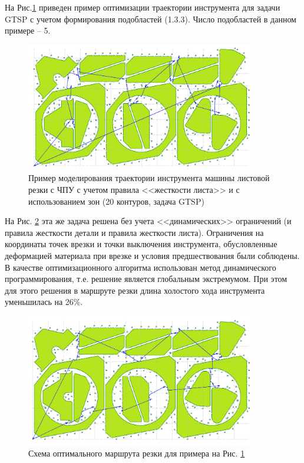 \documentclass[11pt,twoside,openany]{report}
\begin{document}
На Рис.\ref{zones-a}
приведен пример оптимизации траектории
инструмента для задачи GTSP с учетом
формирования подобластей  (1.3.3).
Число подобластей в данном примере – 5.

\begin{figure}
  \begin{center}
  \includegraphics[width=0.9\textwidth]{zones-a.png}
  \caption{Пример моделирования траектории инструмента машины листовой резки с ЧПУ
    с учетом правила <<жесткости листа>> и с использованием зон (20 контуров, задача GTSP)}
  \label{zones-a}
  \end{center}
\end{figure}

На Рис. \ref{zones-b}
эта же задача решена без учета
<<динамических>> ограничений
(и правила жесткости детали и правила жесткости листа).
Ограничения на координаты точек врезки и
точки выключения инструмента,
обусловленные деформацией материала при врезке и
условия предшествования были соблюдены.
В качестве оптимизационного алгоритма
использован метод динамического программирования,
т.е. решение является глобальным экстремумом.
При этом для этого решения в маршруте резки
длина холостого хода инструмента уменьшилась на 26\%.

\begin{figure}
  \begin{center}
  \includegraphics[width=0.9\textwidth]{zones-b.png}
  \caption{Схема оптимального маршрута резки для примера на Рис. \ref{zones-a}}
  \label{zones-b}
  \end{center}
\end{figure}
\end{document}
